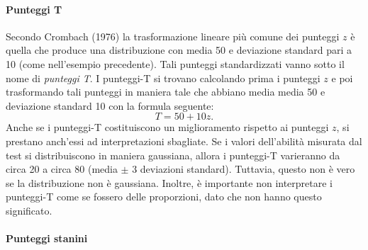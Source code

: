 \paragraph{Punteggi T}

Secondo Crombach (1976) la trasformazione lineare più comune dei punteggi $z$ è quella che produce una distribuzione con media 50 e deviazione standard  pari a 10 (come nell'esempio precedente).
Tali punteggi standardizzati vanno sotto il nome di \emph{punteggi T}.
I punteggi-T si trovano calcolando  prima i punteggi $z$ e poi trasformando tali punteggi in maniera tale che abbiano  media media 50 e deviazione standard 10 con la formula seguente:
$$
T = 50 + 10 z.
$$
Anche se i punteggi-T costituiscono un miglioramento rispetto ai punteggi $z$, si prestano anch'essi ad interpretazioni sbagliate.
 Se i valori dell'abilità misurata dal test si distribuiscono in maniera gaussiana, allora i punteggi-T varieranno da circa 20 a circa 80 (media $\pm$ 3 deviazioni standard).
 Tuttavia, questo non è vero se la distribuzione non è gaussiana.
 Inoltre, è importante non interpretare i punteggi-T come se fossero delle proporzioni, dato che non hanno questo significato.


\paragraph{Punteggi stanini}

